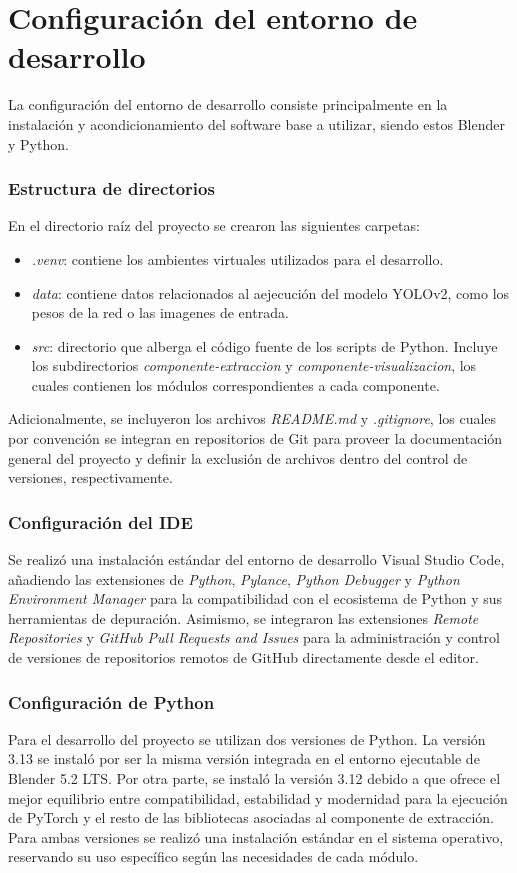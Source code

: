 \section{Configuración del entorno de desarrollo}
La configuración del entorno de desarrollo consiste principalmente en la instalación y acondicionamiento 
del software base a utilizar, siendo estos Blender y Python.

\subsubsection{Estructura de directorios}
En el directorio raíz del proyecto se crearon las siguientes carpetas:
\begin{itemize}
    \item \textit{.venv}: contiene los ambientes virtuales utilizados para el desarrollo.
    \item \textit{data}: contiene datos relacionados al aejecución del modelo YOLOv2, como
    los pesos de la red o las imagenes de entrada.
    \item \textit{src}: directorio que alberga el código fuente de los scripts de Python. 
    Incluye los subdirectorios \textit{componente-extraccion} y \textit{componente-visualizacion}, 
    los cuales contienen los módulos correspondientes a cada componente.
\end{itemize}

Adicionalmente, se incluyeron los archivos \textit{README.md} y \textit{.gitignore}, los cuales por 
convención se integran en repositorios de Git para proveer la documentación general del proyecto y 
definir la exclusión de archivos dentro del control de versiones, respectivamente.

\subsubsection{Configuración del IDE}
Se realizó una instalación estándar del entorno de desarrollo Visual Studio Code, añadiendo las 
extensiones de \textit{Python}, \textit{Pylance}, \textit{Python Debugger} y 
\textit{Python Environment Manager} para la compatibilidad con el ecosistema de Python y sus 
herramientas de depuración. Asimismo, se integraron las extensiones \textit{Remote Repositories} y 
\textit{GitHub Pull Requests and Issues} para la administración y control de versiones de repositorios 
remotos de GitHub directamente desde el editor.

\subsubsection{Configuración de Python}
Para el desarrollo del proyecto se utilizan dos versiones de Python. La versión 3.13 se instaló por ser 
la misma versión integrada en el entorno ejecutable de Blender 5.2 LTS. Por otra parte, se instaló la 
versión 3.12 debido a que ofrece el mejor equilibrio entre compatibilidad, estabilidad y modernidad para 
la ejecución de PyTorch y el resto de las bibliotecas asociadas al componente de extracción. Para ambas 
versiones se realizó una instalación estándar en el sistema operativo, reservando su uso específico según 
las necesidades de cada módulo.

